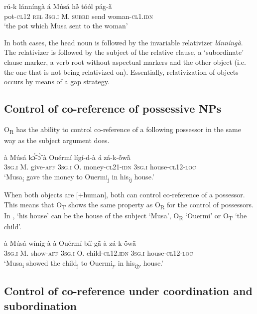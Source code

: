 \documentclass[output=paper]{langsci/langscibook}
\begin{document}
\ea
\label{ex:34.pacchiarotti}
\gll rú-k    lánníngà  á    Músá  hə̃́    tóól  pág-\`{ã}\\
pot-\textsc{cl12}  \textsc{rel}    \textsc{3sg.i}    M.  \textsc{subrd}    send  woman-\textsc{cl1.idn}\\
\glt `the pot which Musa sent to the woman'
\z

In both cases, the head noun is followed by the invariable relativizer \textit{lánníngà}. The relativizer is followed by the subject of the relative clause, a `subordinate' clause marker, a verb root without aspectual markers and the other object (i.e. the one that is not being relativized on). Essentially, relativization of objects occurs by means of a gap strategy. 

\subsection{Control of co-reference of possessive NPs}\label{§5.2:Control.pacchiarotti}

O\textsubscript{R} has the ability to control co-reference of a following possessor in the same way as the subject argument does.

\ea
\label{ex:35.pacchiarotti}
\gll à Músá kɔ̃́-ɔ̃̀ à Ouérmí lígí-d-à \textit{à} zá-k-\'{õ}w\`{ã}  \\
\textsc{3sg.i}  M.  give-\textsc{aff} \textsc{3sg.i} O. money-\textsc{cl21-idn} \textsc{3sg.i}  house-\textsc{cl12-loc}\\
\glt `Musa\textsubscript{i} gave the money to Ouermi\textsubscript{j} in his\textsubscript{ij} house.'
\z

When both objects are [+human], both can control co-reference of a possessor. This means that O\textsubscript{T} shows the same property as O\textsubscript{R} for the control of possessors. In , `his house' can be the house of the subject `Musa', O\textsubscript{R} `Ouermi' or O\textsubscript{T} `the child'.

\ea
\label{ex:36.pacchiarotti}
\gll à Músá wíníg-à à Ouérmí bíí-g\`{ã} à zá-k-\'{õ}w\`{ã}  \\
\textsc{3sg.i}  M.  show-\textsc{aff} \textsc{3sg.i} O. child\textsc{-cl12.idn} \textsc{3sg.i} house-\textsc{cl12-loc}\\
\glt `Musa\textsubscript{i} showed the child\textsubscript{j} to Ouermi\textsubscript{y} in his\textsubscript{ijy} house.' 
\z

\subsection{Control of co-reference under coordination and subordination}\label{§5.3:control.pacchiarotti}
\end{document}
